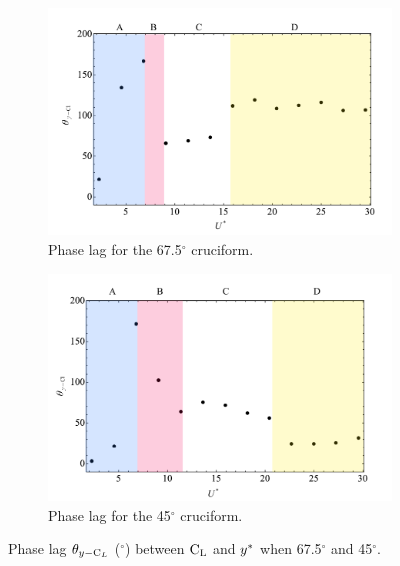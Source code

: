 \documentclass[oneside]{utmthesis}
\begin{document}
\begin{figure}[H]
  \centering
  \begin{subfigure}[h]{0.9\textwidth}
    \includegraphics[width=\textwidth]{figs/phaseLag4}
    \caption{Phase lag for the 67.5$^{\circ}$ cruciform.}
    \label{fig:phaseLag675deg}
  \end{subfigure}

  \begin{subfigure}[h]{0.9\textwidth}
    \includegraphics[width=\textwidth]{figs/phaseLag3}
    \caption{Phase lag for the 45$^{\circ}$ cruciform.}
    \label{fig:phaseLag45deg}
  \end{subfigure}

  \caption{Phase lag $\theta_{y-\text{C}_{L}}$ ($^{\circ}$) between $\text{C}_{\text{L}}$ and $y^{*}$ when 67.5$^{\circ}$ and 45$^{\circ}$.}
  \label{fig:phaseLag67545deg}
\end{figure}
\end{document}
